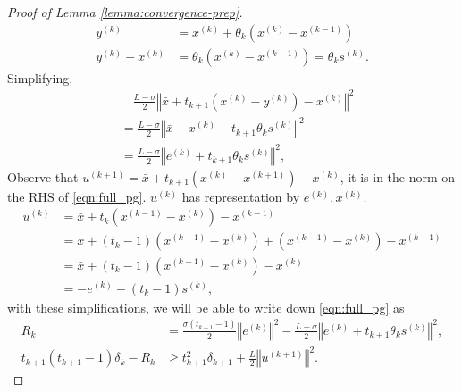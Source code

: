 \begin{proof}[Proof of Lemma \ref*{lemma:convergence-prep}]
        \begin{align*}
                y^{(k)} &= x^{(k)} + \theta_k(x^{(k)} - x^{(k - 1)})
                \\
                y^{(k)} - x^{(k)} &= \theta_k(x^{(k)} - x^{(k - 1)}) = \theta_k s^{(k)}. 
        \end{align*}
        Simplifying, 
        \begin{align*}
            &\quad \frac{L - \sigma}{2}
            \left\Vert
                \bar x + t_{k + 1}\left( x^{(k)} - y^{(k)}\right) - x^{(k)}
            \right\Vert^2
            \\
            &=  \frac{L - \sigma}{2}\left\Vert
                \bar x - x^{(k)} - t_{k + 1}\theta_k s^{(k)}
            \right\Vert^2
            \\
            &= \frac{L - \sigma}{2}\left\Vert e^{(k)} + t_{k + 1}\theta_k s^{(k)}\right\Vert^2, 
        \end{align*}
        Observe that $u^{(k + 1)} = \bar x + t_{k + 1}(x^{(k)} - x^{(k +1)}) - x^{(k)}$, it is in the norm on the RHS of \hyperref[eqn:full_pg]{\ref*{eqn:full_pg}}. 
        $u^{(k)}$ has representation by $e^{(k)}, x^{(k)}$. 
        \begin{align*}
            u^{(k)} &= \bar x + t_{k}\left(x^{(k - 1)} - x^{(k)} \right) - x^{(k - 1)}
            \\
            &= \bar x + (t_{k} - 1)\left(
                x^{(k - 1)} - x^{(k)}
            \right) + 
            \left(
                x^{(k - 1)} - x^{(k)}
            \right) - x^{(k - 1)}
            \\
            &= \bar x + 
            (t_{k} - 1)\left(x^{(k - 1)} - x^{(k)}\right)
            - x^{(k)}
            \\
            &= - e^{(k)} - (t_{k} - 1)s^{(k)}, 
        \end{align*}
        with these simplifications, we will be able to write down \hyperref[eqn:full_pg]{\ref*{eqn:full_pg}} as 
        \begin{align}
            R_k &=  
            \frac{\sigma(t_{k + 1} - 1)}{2}
            \left\Vert e^{(k)}\right\Vert^2
            - 
            \frac{L - \sigma}{2}\left\Vert e^{(k)} + t_{k + 1}\theta_k s^{(k)}\right\Vert^2, 
            \\
            t_{k + 1}(t_{k + 1} - 1)\delta_k - R_k
            &\ge 
            t_{k + 1}^2\delta_{k + 1} + \frac{L}{2}\left\Vert u^{(k + 1)}\right\Vert^2. 
        \end{align}

\end{proof}
